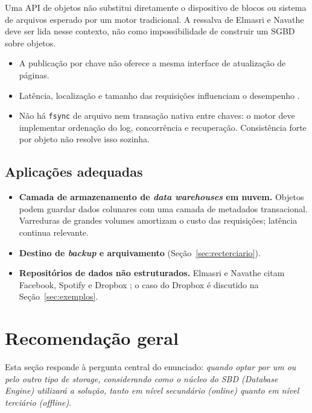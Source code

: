 \documentclass[11pt,a4paper]{article}
\begin{document}
Uma API de objetos não substitui diretamente o dispositivo de blocos ou sistema de arquivos
esperado por um motor tradicional. A ressalva de Elmasri e Navathe \cite{elmasri2018} deve ser
lida nesse contexto, não como impossibilidade de construir um SGBD sobre objetos.
\begin{itemize}[leftmargin=0.7cm,itemsep=2pt]
\item A publicação por chave não oferece a mesma interface de atualização de páginas.
\item Latência, localização e tamanho das requisições influenciam o desempenho \cite{silberschatz2020}.
\item Não há \texttt{fsync} de arquivo nem transação nativa entre chaves: o motor deve implementar
ordenação do log, concorrência e recuperação. Consistência forte por objeto não resolve isso sozinha.
\end{itemize}

\subsection{Aplicações adequadas}

\begin{itemize}[leftmargin=0.7cm,itemsep=2pt]
\item \textbf{Camada de armazenamento de \textit{data warehouses} em nuvem.} Objetos podem guardar dados colunares com uma camada de metadados transacional. Varreduras de grandes volumes amortizam o custo das requisições; latência continua relevante.


\item \textbf{Destino de \textit{backup} e arquivamento} (Seção~\ref{sec:recterciario}).
\item \textbf{Repositórios de dados não estruturados.} Elmasri e Navathe citam Facebook, Spotify e
Dropbox \cite{elmasri2018}; o caso do Dropbox é discutido na Seção~\ref{sec:exemplos}.
\end{itemize}

\section{Recomendação geral}
\label{sec:recomendacao}

Esta seção responde à pergunta central do enunciado: \emph{quando optar por um ou pelo outro tipo
de \textit{storage}, considerando como o núcleo do SBD (\textit{Database Engine}) utilizará a
solução, tanto em nível secundário (\textit{online}) quanto em nível terciário (\textit{offline})}.
\end{document}
